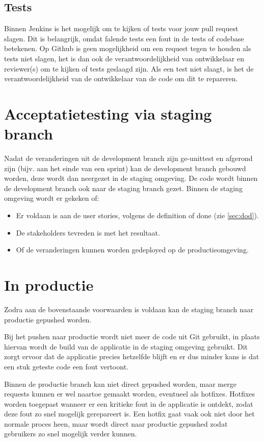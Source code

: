 \subsection{Tests}
Binnen Jenkins is het mogelijk om te kijken of tests voor jouw pull request slagen.
Dit is belangrijk, omdat falende tests een fout in de tests of codebase betekenen.
Op Github is geen mogelijkheid om een request tegen te houden als tests niet slagen, het is dan ook de verantwoordelijkheid van ontwikkelaar en reviewer(s) om te kijken of tests geslaagd zijn.
Als een test niet slaagt, is het de verantwoordelijkheid van de ontwikkelaar van de code om dit te repareren.

\section{Acceptatietesting via staging branch}
Nadat de veranderingen uit de development branch zijn ge-unittest en afgerond zijn (bijv. aan het einde van een sprint) kan de development branch gebouwd worden, deze wordt dan neergezet in de staging omgeving. De code wordt binnen de development branch ook naar de staging branch gezet.
Binnen de staging omgeving wordt er gekeken of:
\begin{itemize}
	\item Er voldaan is aan de user stories, volgens de definition of done (zie \cref{sec:dod}).
	\item De stakeholders tevreden is met het resultaat.
	\item Of de veranderingen kunnen worden gedeployed op de productieomgeving.
\end{itemize}

\section{In productie}
Zodra aan de bovenstaande voorwaarden is voldaan kan de staging branch naar productie gepushed worden.
\par
Bij het pushen naar productie wordt niet meer de code uit Git gebruikt, in plaats hiervan wordt de build van de applicatie in de staging omgeving gebruikt.
Dit zorgt ervoor dat de applicatie precies hetzelfde blijft en er dus minder kans is dat een stuk geteste code een fout vertoont.
\par
Binnen de productie branch kan niet direct gepushed worden, maar merge requests kunnen er wel naartoe gemaakt worden, eventueel als hotfixes. Hotfixes worden toegepast wanneer er een kritieke fout in de applicatie is ontdekt, zodat deze fout zo snel mogelijk gerepareert is.
Een hotfix gaat vaak ook niet door het normale proces heen, maar wordt direct naar productie gepushed zodat gebruikers zo snel mogelijk verder kunnen.

